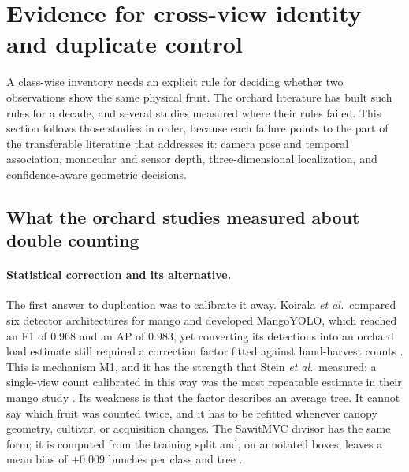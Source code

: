 \section{Evidence for cross-view identity and duplicate control}
\label{sec:identity}

A class-wise inventory needs an explicit rule for deciding whether two observations show the same physical fruit. The orchard literature has built such rules for a decade, and several studies measured where their rules failed. This section follows those studies in order, because each failure points to the part of the transferable literature that addresses it: camera pose and temporal association, monocular and sensor depth, three-dimensional localization, and confidence-aware geometric decisions.

\subsection{What the orchard studies measured about double counting}
\label{sec:orchard}

\paragraph{Statistical correction and its alternative.} The first answer to duplication was to calibrate it away. Koirala \textit{et al.}\ compared six detector architectures for mango and developed MangoYOLO, which reached an F1 of 0.968 and an AP of 0.983, yet converting its detections into an orchard load estimate still required a correction factor fitted against hand-harvest counts \cite{koirala2019deepfruit}. This is mechanism M1, and it has the strength that Stein \textit{et al.}\ measured: a single-view count calibrated in this way was the most repeatable estimate in their mango study \cite{ledger_r_408d13511cac4177}. Its weakness is that the factor describes an average tree. It cannot say which fruit was counted twice, and it has to be refitted whenever canopy geometry, cultivar, or acquisition changes. The SawitMVC divisor has the same form; it is computed from the training split and, on annotated boxes, leaves a mean bias of $+0.009$ bunches per class and tree \cite{indriani2026sawitmvc}.

